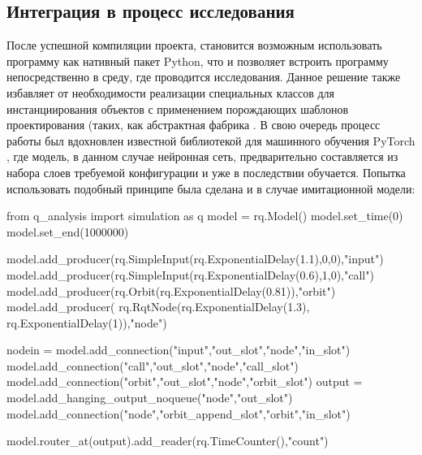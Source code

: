 \subsection{Интеграция в процесс исследования}
После успешной компиляции проекта, становится возможным использовать программу как нативный пакет Python, что и позволяет встроить программу непосредственно в среду, где проводится исследования. Данное решение также избавляет от необходимости реализации специальных классов для инстанциирования объектов с применением порождающих шаблонов проектирования (таких, как абстрактная фабрика \cite{fowler1997analysis}. В свою очередь процесс работы был вдохновлен известной библиотекой для машинного обучения PyTorch \cite{pytorch}, где модель, в данном случае нейронная сеть, предварительно составляется из набора слоев требуемой конфигурации и уже в последствии обучается. Попытка использовать подобный принципе была сделана и в случае имитационной модели: 
\begin{pyin} [pyexampleinit]
from q_analysis import simulation as q
model = rq.Model()
model.set_time(0) 
model.set_end(1000000)
\end{pyin}

\begin{pyin}[pyexampleaddproducers]
model.add_producer(rq.SimpleInput(rq.ExponentialDelay(1.1),0,0),"input")
model.add_producer(rq.SimpleInput(rq.ExponentialDelay(0.6),1,0),"call")
model.add_producer(rq.Orbit(rq.ExponentialDelay(0.81)),"orbit")
model.add_producer(
             rq.RqtNode(rq.ExponentialDelay(1.3),
             rq.ExponentialDelay(1)),"node")
\end{pyin}

\begin{pyin}[pyexampleaddconnections]
nodein = model.add_connection("input","out_slot","node","in_slot")
model.add_connection("call","out_slot","node","call_slot")
model.add_connection("orbit","out_slot","node","orbit_slot")
output = model.add_hanging_output_noqueue("node","out_slot")
model.add_connection("node","orbit_append_slot","orbit","in_slot")
\end{pyin}

\begin{pyin}[pyexampleaddreaders]
model.router_at(output).add_reader(rq.TimeCounter(),"count")
\end{pyin}

